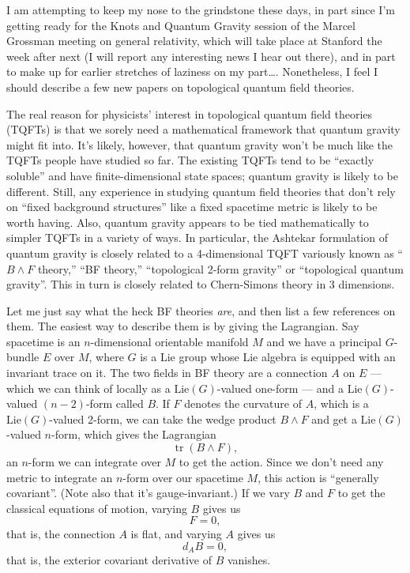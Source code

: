 \documentclass{article}
\begin{document}
I am attempting to keep my nose to the grindstone these days, in part
since I'm getting ready for the Knots and Quantum Gravity session of the
Marcel Grossman meeting on general relativity, which will take place at
Stanford the week after next (I will report any interesting news I hear
out there), and in part to make up for earlier stretches of laziness on
my part\ldots. Nonetheless, I feel I should describe a few new papers on
topological quantum field theories.

The real reason for physicists' interest in topological quantum field
theories (TQFTs) is that we sorely need a mathematical framework that
quantum gravity might fit into. It's likely, however, that quantum
gravity won't be much like the TQFTs people have studied so far. The
existing TQFTs tend to be ``exactly soluble'' and have
finite-dimensional state spaces; quantum gravity is likely to be
different. Still, any experience in studying quantum field theories that
don't rely on ``fixed background structures'' like a fixed spacetime
metric is likely to be worth having. Also, quantum gravity appears to be
tied mathematically to simpler TQFTs in a variety of ways. In
particular, the Ashtekar formulation of quantum gravity is closely
related to a 4-dimensional TQFT variously known as ``\(B \wedge F\)
theory,'' ``BF theory,'' ``topological 2-form gravity'' or ``topological
quantum gravity''. This in turn is closely related to Chern-Simons
theory in 3 dimensions.

Let me just say what the heck BF theories \emph{are}, and then list a
few references on them. The easiest way to describe them is by giving
the Lagrangian. Say spacetime is an \(n\)-dimensional orientable
manifold \(M\) and we have a principal \(G\)-bundle \(E\) over \(M\),
where \(G\) is a Lie group whose Lie algebra is equipped with an
invariant trace on it. The two fields in BF theory are a connection
\(A\) on \(E\) --- which we can think of locally as a
\(\mathrm{Lie}(G)\)-valued one-form --- and a \(\mathrm{Lie}(G)\)-valued
\((n-2)\)-form called \(B\). If \(F\) denotes the curvature of \(A\),
which is a \(\mathrm{Lie}(G)\)-valued 2-form, we can take the wedge
product \(B\wedge F\) and get a \(\mathrm{Lie}(G)\)-valued \(n\)-form,
which gives the Lagrangian \[\operatorname{tr}(B \wedge F),\] an
\(n\)-form we can integrate over \(M\) to get the action. Since we don't
need any metric to integrate an \(n\)-form over our spacetime \(M\),
this action is ``generally covariant''. (Note also that it's
gauge-invariant.) If we vary \(B\) and \(F\) to get the classical
equations of motion, varying \(B\) gives us \[F = 0,\] that is, the
connection \(A\) is flat, and varying \(A\) gives us \[d_A B = 0,\] that
is, the exterior covariant derivative of \(B\) vanishes.
\end{document}
